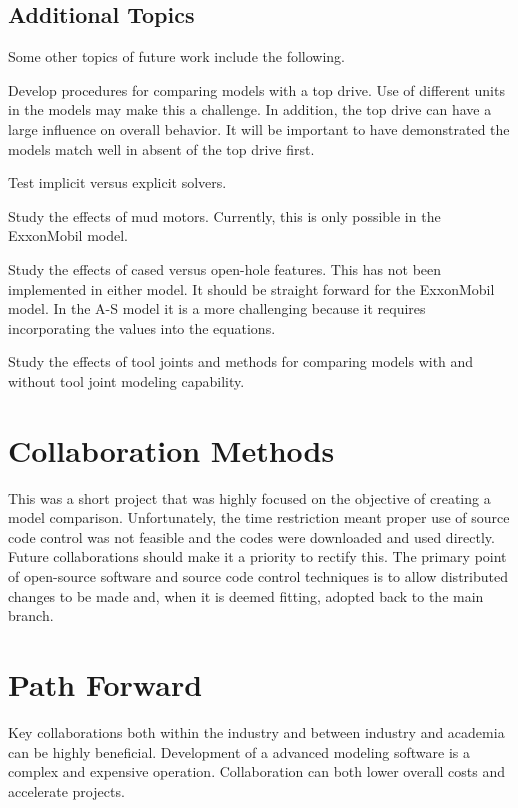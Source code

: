 \subsection{Additional Topics}
Some other topics of future work include the following.
\begin{bulletedlist}
    \item Develop procedures for comparing models with a top drive.  Use of different units in the models may make this a challenge.  In addition, the top drive can have a large influence on overall behavior.  It will be important to have demonstrated the models match well in absent of the top drive first.
	\item Test implicit versus explicit solvers.
	\item Study the effects of mud motors.  Currently, this is only possible in the ExxonMobil model.
    \item Study the effects of cased versus open-hole features.  This has not been implemented in either model.  It should be straight forward for the ExxonMobil model.  In the A-S model it is a more challenging because it requires incorporating the values into the equations.
    \item Study the effects of tool joints and methods for comparing models with and without tool joint modeling capability.
\end{bulletedlist}

\section{Collaboration Methods}
This was a short project that was highly focused on the objective of creating a model comparison.  Unfortunately, the time restriction meant proper use of source code control was not feasible and the codes were downloaded and used directly.  Future collaborations should make it a priority to rectify this.  The primary point of open-source software and source code control techniques is to allow distributed changes to be made and, when it is deemed fitting, adopted back to the main branch.

\section{Path Forward}
Key collaborations both within the industry and between industry and academia can be highly beneficial.  Development of a advanced modeling software is a complex and expensive operation.  Collaboration can both lower overall costs and accelerate projects.

